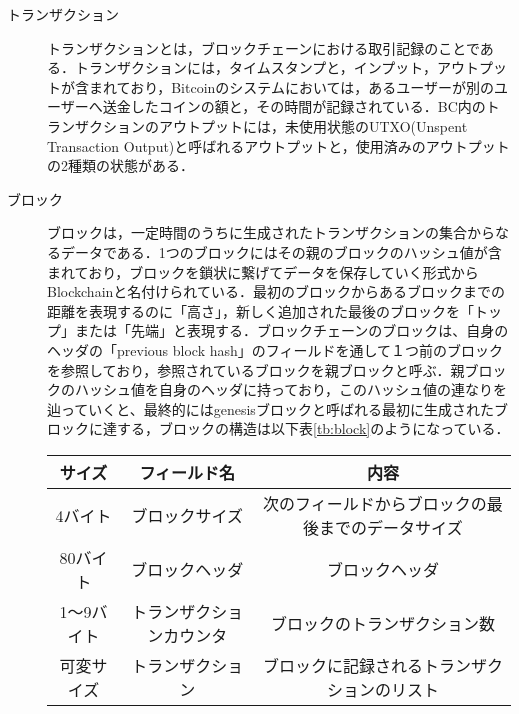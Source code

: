 \documentclass[japanese, macos]{KU2}
\begin{document}
\begin{description}
\item[トランザクション] トランザクションとは，ブロックチェーンにおける取引記録のことである．トランザクションには，タイムスタンプと，インプット，アウトプットが含まれており，Bitcoinのシステムにおいては，あるユーザーが別のユーザーへ送金したコインの額と，その時間が記録されている．BC内のトランザクションのアウトプットには，未使用状態のUTXO(Unspent Transaction Output)と呼ばれるアウトプットと，使用済みのアウトプットの2種類の状態がある．
\item[ブロック] ブロックは，一定時間のうちに生成されたトランザクションの集合からなるデータである．1つのブロックにはその親のブロックのハッシュ値が含まれており，ブロックを鎖状に繋げてデータを保存していく形式からBlockchainと名付けられている．最初のブロックからあるブロックまでの距離を表現するのに「高さ」，新しく追加された最後のブロックを「トップ」または「先端」と表現する．ブロックチェーンのブロックは、自身のヘッダの「previous block hash」のフィールドを通して１つ前のブロックを参照しており，参照されているブロックを親ブロックと呼ぶ．親ブロックのハッシュ値を自身のヘッダに持っており，このハッシュ値の連なりを辿っていくと、最終的にはgenesisブロックと呼ばれる最初に生成されたブロックに達する，ブロックの構造は以下表\ref{tb:block}のようになっている．\\

\begin{table*}[htbp]
    \begin{center}
    \begin{tabular}{|c|c|c|} \hline
       サイズ & フィールド名 & 内容  \\ \hline
       4バイト & ブロックサイズ & 次のフィールドからブロックの最後までのデータサイズ\\ \hline
      80バイト & ブロックヘッダ & ブロックヘッダ \\ \hline
       1〜9バイト & トランザクションカウンタ & ブロックのトランザクション数 \\ \hline
       可変サイズ & トランザクション & ブロックに記録されるトランザクションのリスト \\ \hline
    \end{tabular}
    \end{center}
    \caption{ブロック構造 \label{tb:block}}
\end{table*}


\end{description}
\end{document}
